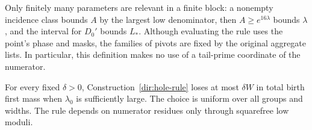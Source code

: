Only finitely many parameters are relevant in a finite block: a
nonempty incidence class bounds $A$ by the largest low denominator, then
$A\ge e^{16\lambda}$ bounds $\lambda$, and the interval for $D_0'$
bounds $L_*$. Although evaluating the rule uses the point's phase and
masks, the families of pivots are fixed by the original aggregate lists.
In particular, this definition makes no use of a tail-prime coordinate
of the numerator.

\begin{lemma}\label{dir:holes}
For every fixed $\delta>0$, Construction~\ref{dir:hole-rule} loses at
most $\delta W$ in total birth first mass when $\lambda_0$ is sufficiently
large. The choice is uniform over all groups and widths. The rule
depends on numerator residues only through squarefree low moduli.
\end{lemma}

